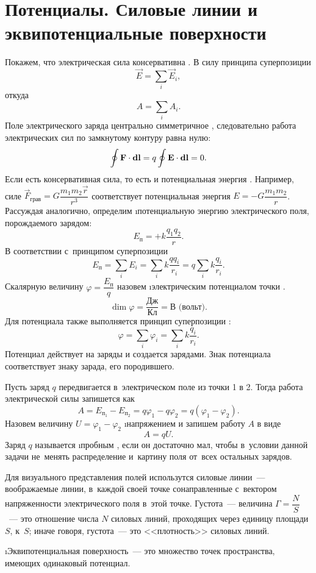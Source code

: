 \section{Потенциалы. Силовые линии и эквипотенциальные поверхности}

	Покажем, что электрическая сила консервативна . В силу принципа суперпозиции 
		$$\vec{E}=\sum_i \vec{E}_i,$$
	откуда
		$$A=\sum_i A_i.$$
	Поле электрического заряда центрально симметричное , следовательно работа  электрических сил по замкнутому контуру равна нулю:
		$$\oint \text{\textbf{F}}\cdot\textbf{d}\text{\textbf{l}}=q\oint \text{\textbf{E}}\cdot\textbf{d}\text{\textbf{l}}=0.$$
	Если есть консервативная сила, то есть и потенциальная энергия . Например, силе $\vec{F}_{\text{грав}}=G\dfrac{m_1m_2\vec{r}}{r^3}$ соответствует потенциальная энергия $E=-G\dfrac{m_1m_2}{r}$. Рассуждая аналогично, определим \i{потенциальную энергию электрического поля, порождаемого зарядом}:
		\begin{equation}
			E_{\text{п}}=+k\frac{q_1q_2}{r}.
		\end{equation}
	В соответствии с~принципом суперпозиции
		$$E_{\text{п}}=\sum_i E_i=\sum_i k\frac{qq_i}{r_i}=q\sum_i k\frac{q_i}{r_i}.$$
	Скалярную величину $\varphi=\dfrac{E_{\text{п}}}{q}$ назовем \i{электрическим потенциалом точки} .
		$$\dim{\varphi}=\frac{\text{Дж}}{\text{Кл}}=\text{В (вольт)}.$$
	Для потенциала также выполняется принцип суперпозиции :
		$$\varphi=\sum_i \varphi_i=\sum_i k\frac{q_i}{r_i}.$$
	Потенциал действует на заряды  и создается зарядами. Знак потенциала соответствует знаку зарада, его породившего. \par
	Пусть заряд $q$ передвигается в~электрическом поле  из точки 1 в 2. Тогда работа  электрической силы запишется как
		$$A=E_{\text{п}_{\text{1}}}-E_{\text{п}_{\text{2}}}=q\varphi_1-q\varphi_2=q(\varphi_1-\varphi_2).$$
	Назовем величину $U=\varphi_1-\varphi_2$ \i{напряжением}  и запишем работу $A$ в виде
		\begin{equation}
			A=qU.
		\end{equation}
	Заряд $q$ называется \i{пробным} , если он достаточно мал, чтобы в~условии данной задачи не~менять распределение и~картину поля от~всех остальных зарядов.\par
	Для визуального представления полей использутся силовые линии~--- воображаемые линии, в~каждой своей точке сонаправленные с~вектором  напряженности электрического поля в~этой точке. Густота~--- величина $\Gamma=\dfrac{N}{S}$~--- это отношение числа $N$ силовых линий, проходящих через единицу площади $S$, к~$S$; иначе говоря, густота~--- это <<плотность>> силовых линий.\par
	\i{Эквипотенциальная поверхность}~--- это множество точек пространства, имеющих одинаковый потенциал.
	
